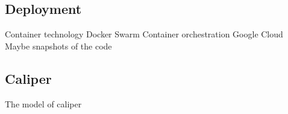\subsection{Deployment}
Container technology
Docker Swarm Container orchestration
Google Cloud
Maybe snapshots of the code


\subsection{Caliper}

The model of caliper

